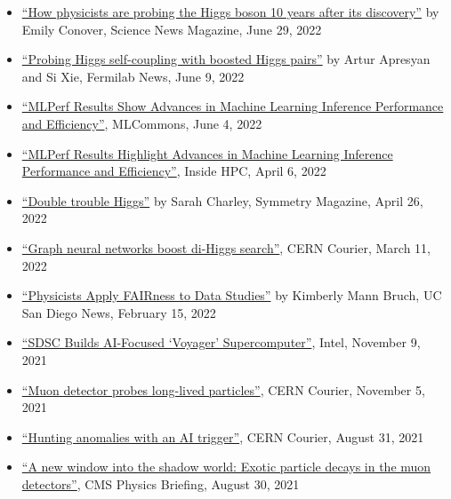 \documentclass[11pt]{res}
\begin{document}
\begin{resume}
  \begin{itemize}
    \itemsep-0.3em
    \item \href{https://www.sciencenews.org/article/higgs-boson-particle-physics-standard-model-discovery-anniversary}{``How physicists are probing the Higgs boson 10 years after its discovery''} by Emily Conover, Science News Magazine, June 29, 2022
    \item \href{https://news.fnal.gov/2022/06/probing-higgs-self-coupling-with-boosted-higgs-pairs/}{``Probing Higgs self-coupling with boosted Higgs pairs''} by Artur Apresyan and Si Xie, Fermilab News, June 9, 2022
    \item \href{https://mlcommons.org/en/news/mlperf-inference-1q2022/}{``MLPerf Results Show Advances in Machine Learning Inference Performance and Efficiency''}, MLCommons, June 4, 2022
    \item \href{https://insidehpc.com/2022/04/mlperf-results-highlight-advances-in-machine-learning-inference-performance-and-efficiency/}{``MLPerf Results Highlight Advances in Machine Learning Inference Performance and Efficiency''}, Inside HPC, April 6, 2022
    \item \href{https://www.symmetrymagazine.org/article/double-trouble-higgs}{``Double trouble Higgs''} by Sarah Charley, Symmetry Magazine, April 26, 2022
    \item \href{https://cerncourier.com/a/graph-neural-networks-boost-di-higgs-search/}{``Graph neural networks boost di-Higgs search''}, CERN Courier, March 11, 2022
    \item \href{https://ucsdnews.ucsd.edu/pressrelease/physicists-apply-fairness-to-data-studies}{``Physicists Apply FAIRness to Data Studies''} by Kimberly Mann Bruch, UC San Diego News, February 15, 2022
    \item \href{https://www.intel.com/content/www/us/en/customer-spotlight/stories/san-diego-supercomputer-customer-story.html}{``SDSC Builds AI-Focused `Voyager' Supercomputer''}, Intel, November 9, 2021
    \item \href{https://cerncourier.com/a/muon-detector-probes-long-lived-particles/}{``Muon detector probes long-lived particles''}, CERN Courier, November 5, 2021
    \item \href{https://cerncourier.com/a/hunting-anomalies-with-an-ai-trigger/}{``Hunting anomalies with an AI trigger''}, CERN Courier, August 31, 2021
    \item \href{https://cms.cern/news/new-window-shadow-world-exotic-particle-decays-muon-detectors}{``A new window into the shadow world: Exotic particle decays in the muon detectors''}, CMS Physics Briefing, August 30, 2021

\end{itemize}
\end{resume}
\end{document}
